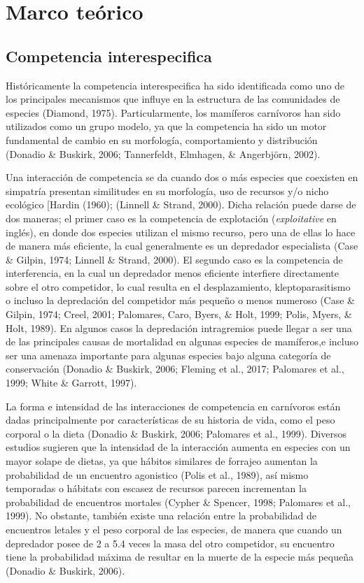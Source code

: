 \documentclass[12pt,twoside]{reedthesis}
\begin{document}
\hypertarget{marco-teuxf3rico}{%
\section{Marco teórico}\label{marco-teuxf3rico}}

\hypertarget{competencia-interespecifica}{%
\subsection{Competencia interespecifica}\label{competencia-interespecifica}}

Históricamente la competencia interespecifica ha sido identificada como uno de los principales mecanismos que influye en la estructura de las comunidades de especies (Diamond, 1975). Particularmente, los mamíferos carnívoros han sido utilizados como un grupo modelo, ya que la competencia ha sido un motor fundamental de cambio en su morfología, comportamiento y distribución (Donadio \& Buskirk, 2006; Tannerfeldt, Elmhagen, \& Angerbjörn, 2002).

Una interacción de competencia se da cuando dos o más especies que coexisten en simpatría presentan similitudes en su morfología, uso de recursos y/o nicho ecológico {[}Hardin (1960); (Linnell \& Strand, 2000). Dicha relación puede darse de dos maneras; el primer caso es la competencia de explotación (\emph{exploitative} en inglés), en donde dos especies utilizan el mismo recurso, pero una de ellas lo hace de manera más eficiente, la cual generalmente es un depredador especialista (Case \& Gilpin, 1974; Linnell \& Strand, 2000). El segundo caso es la competencia de interferencia, en la cual un depredador menos eficiente interfiere directamente sobre el otro competidor, lo cual resulta en el desplazamiento, kleptoparasitismo o incluso la depredación del competidor más pequeño o menos numeroso (Case \& Gilpin, 1974; Creel, 2001; Palomares, Caro, Byers, \& Holt, 1999; Polis, Myers, \& Holt, 1989). En algunos casos la depredación intragremios puede llegar a ser una de las principales causas de mortalidad en algunas especies de mamíferos,e incluso ser una amenaza importante para algunas especies bajo alguna categoría de conservación (Donadio \& Buskirk, 2006; Fleming et al., 2017; Palomares et al., 1999; White \& Garrott, 1997).

La forma e intensidad de las interacciones de competencia en carnívoros están dadas principalmente por características de su historia de vida, como el peso corporal o la dieta (Donadio \& Buskirk, 2006; Palomares et al., 1999). Diversos estudios sugieren que la intensidad de la interacción aumenta en especies con un mayor solape de dietas, ya que hábitos similares de forrajeo aumentan la probabilidad de un encuentro agonistico (Polis et al., 1989), así mismo temporadas o hábitats con escasez de recursos parecen incrementan la probabilidad de encuentros mortales (Cypher \& Spencer, 1998; Palomares et al., 1999). No obstante, también existe una relación entre la probabilidad de encuentros letales y el peso corporal de las especies, de manera que cuando un depredador posee de 2 a 5.4 veces la masa del otro competidor, su encuentro tiene la probabilidad máxima de resultar en la muerte de la especie más pequeña (Donadio \& Buskirk, 2006).
\end{document}

